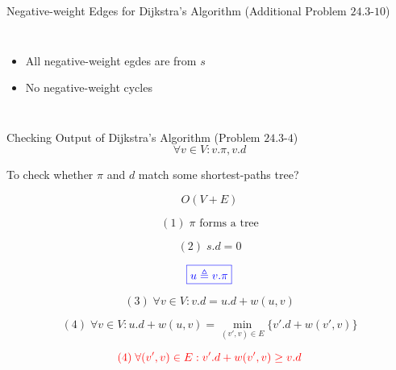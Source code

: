 \begin{frame}{}
  \begin{exampleblock}{Negative-weight Edges for Dijkstra's Algorithm (Additional Problem $24.3$-$10$)}
    \begin{columns}
	\begin{itemize}
	  \item All negative-weight egdes are from $s$
	  \item No negative-weight cycles
	\end{itemize}
    \end{columns}
  \end{exampleblock}

  \pause
\end{frame}

\begin{frame}{}
  \begin{exampleblock}{Checking Output of Dijkstra's Algorithm (Problem $24.3$-$4$)}
    \[
      \forall v \in V: v.\pi, v.d
    \]

    \begin{center}
      To check whether $\pi$ and $d$ match some shortest-paths tree?
    \end{center}
    \[
      O(V + E)
    \]
  \end{exampleblock}
\end{frame}

\begin{frame}{}
  \[
    (1)\; \pi \text{ forms a tree}
  \]
  
  \pause
  \[
    (2)\; s.d = 0
  \]
  
  \pause
  \[
    \textcolor{blue}{\boxed{u \triangleq v.\pi}}
  \]
  
  \[
    (3)\; \forall v \in V: v.d = u.d + w(u, v)
  \]
  
  \pause
  \[
    (4)\; \forall v \in V: u.d + w(u, v) = \min\limits_{(v', v) \in E} \Big\{ v'.d + w(v', v) \Big\}
  \]
  
  \pause
  \[
    \textcolor{red}{(4)\;   \forall (v', v) \in E: v'.d + w(v', v) \ge v.d}
  \]
\end{frame}

\begin{frame}{}
\end{frame}

